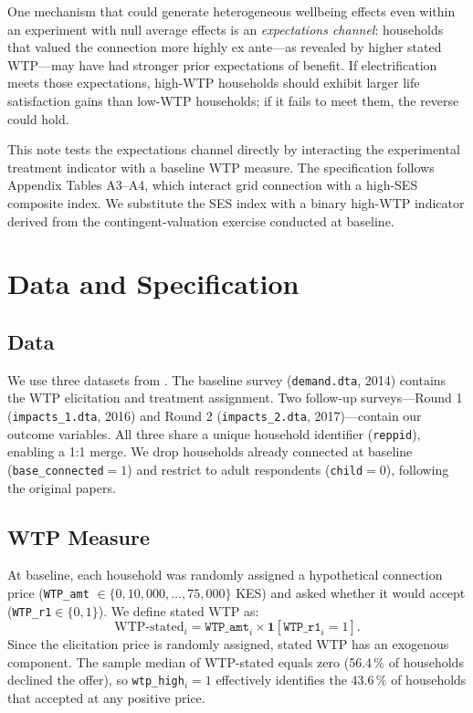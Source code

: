\documentclass[12pt]{article}
\begin{document}
One mechanism that could generate heterogeneous wellbeing effects even
within an experiment with null average effects is an \emph{expectations
channel}: households that valued the connection more highly ex ante---as
revealed by higher stated WTP---may have had stronger prior expectations
of benefit. If electrification meets those expectations, high-WTP
households should exhibit larger life satisfaction gains than low-WTP
households; if it fails to meet them, the reverse could hold.

This note tests the expectations channel directly by interacting the
experimental treatment indicator with a baseline WTP measure. The
specification follows \citet{lee2019jep} Appendix Tables A3--A4, which
interact grid connection with a high-SES composite index. We substitute
the SES index with a binary high-WTP indicator derived from the
contingent-valuation exercise conducted at baseline.

\section{Data and Specification}
\label{sec:data}

\subsection*{Data}

We use three datasets from \citet{lee2019jpe}. The baseline survey
(\texttt{demand.dta}, 2014) contains the WTP elicitation and treatment
assignment. Two follow-up surveys---Round 1 (\texttt{impacts\_1.dta},
2016) and Round 2 (\texttt{impacts\_2.dta}, 2017)---contain our outcome
variables. All three share a unique household identifier
(\texttt{reppid}), enabling a 1:1 merge. We drop households already
connected at baseline (\texttt{base\_connected}$=1$) and restrict to
adult respondents (\texttt{child}$=0$), following the original papers.

\subsection*{WTP Measure}

At baseline, each household was randomly assigned a hypothetical
connection price (\texttt{WTP\_amt} $\in \{0, 10{,}000, \ldots,
75{,}000\}$ KES) and asked whether it would accept
(\texttt{WTP\_r1}$\in\{0,1\}$). We define stated WTP as:
\begin{equation}
\label{eq:wtp}
\text{WTP-stated}_i = \texttt{WTP\_amt}_i \times
\mathbf{1}[\texttt{WTP\_r1}_i = 1].
\end{equation}
Since the elicitation price is randomly assigned, stated WTP has an
exogenous component. The sample median of WTP-stated equals zero (56.4\,\%
of households declined the offer), so \texttt{wtp\_high}$_i = 1$
effectively identifies the 43.6\,\% of households that accepted at any
positive price.
\end{document}
